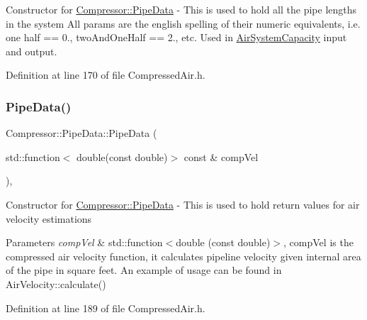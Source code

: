 Constructor for \hyperlink{struct_compressor_1_1_pipe_data}{Compressor\+::\+Pipe\+Data} -\/ This is used to hold all the pipe lengths in the system All params are the english spelling of their numeric equivalents, i.\+e. one half == 0., two\+And\+One\+Half == 2., etc. Used in \hyperlink{class_compressor_1_1_air_system_capacity}{Air\+System\+Capacity} input and output. 

Definition at line 170 of file Compressed\+Air.\+h.

\mbox{\label{struct_compressor_1_1_pipe_data_af7998fd533340b0a84e78fcda91b4806}} 
\subsubsection{\texorpdfstring{Pipe\+Data()}{PipeData()}\hspace{0.1cm}{\footnotesize\ttfamily [2/6]}}
{\footnotesize\ttfamily Compressor\+::\+Pipe\+Data\+::\+Pipe\+Data (\begin{DoxyParamCaption}\item[{std\+::function$<$ double(const double)$>$ const \&}]{comp\+Vel }\end{DoxyParamCaption})\hspace{0.3cm}{\ttfamily [inline]}, {\ttfamily [explicit]}}

Constructor for \hyperlink{struct_compressor_1_1_pipe_data}{Compressor\+::\+Pipe\+Data} -\/ This is used to hold return values for air velocity estimations 
\begin{DoxyParams}{Parameters}
{\em comp\+Vel} & std\+::function$<$double (const double)$>$, comp\+Vel is the compressed air velocity function, it calculates pipeline velocity given internal area of the pipe in square feet. An example of usage can be found in Air\+Velocity\+::calculate() \\
\hline
\end{DoxyParams}


Definition at line 189 of file Compressed\+Air.\+h.

\mbox{\label{struct_compressor_1_1_pipe_data_a71acdc81e25bd90b51361bf8d4f0ed38}} 
